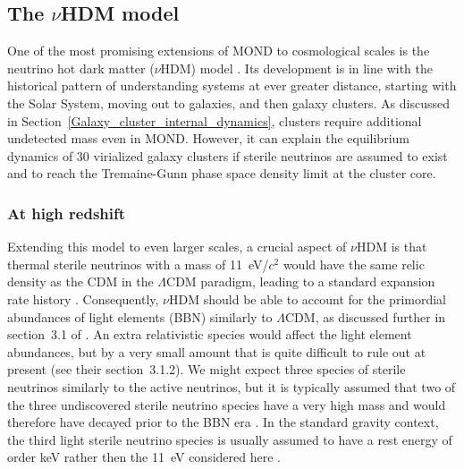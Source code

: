 \documentclass[fleqn,usenatbib,useAMS]{mnras} %
\begin{document}
\subsection{The \texorpdfstring{$\nu$}{v}HDM model}
\label{nuHDM}

One of the most promising extensions of MOND to cosmological scales is the neutrino hot dark matter ($\nu$HDM) model \citep{Angus_2009}. Its development is in line with the historical pattern of understanding systems at ever greater distance, starting with the Solar System, moving out to galaxies, and then galaxy clusters. As discussed in Section~\ref{Galaxy_cluster_internal_dynamics}, clusters require additional undetected mass even in MOND. However, it can explain the equilibrium dynamics of 30 virialized galaxy clusters \citep{Angus_2010} if sterile neutrinos are assumed to exist and to reach the Tremaine-Gunn phase space density limit \citep{Tremaine_Gunn_1979} at the cluster core.


\subsubsection{At high redshift}
\label{nuHDM_early}

Extending this model to even larger scales, a crucial aspect of $\nu$HDM is that thermal sterile neutrinos with a mass of 11~eV/$c^2$ would have the same relic density as the CDM in the $\Lambda$CDM paradigm, leading to a standard expansion rate history \citep{Dodelson_2006, Skordis_2006_theory, Skordis_2006}. Consequently, $\nu$HDM should be able to account for the primordial abundances of light elements (BBN) similarly to $\Lambda$CDM, as discussed further in section~3.1 of \citet{Haslbauer_2020}. An extra relativistic species would affect the light element abundances, but by a very small amount that is quite difficult to rule out at present (see their section~3.1.2). We might expect three species of sterile neutrinos similarly to the active neutrinos, but it is typically assumed that two of the three undiscovered sterile neutrino species have a very high mass and would therefore have decayed prior to the BBN era \citep[see figure~3 of][]{Ruchayskiy_2012}. In the standard gravity context, the third light sterile neutrino species is usually assumed to have a rest energy of order keV rather then the 11~eV considered here \citep{Adhikari_2017}.
\end{document}
